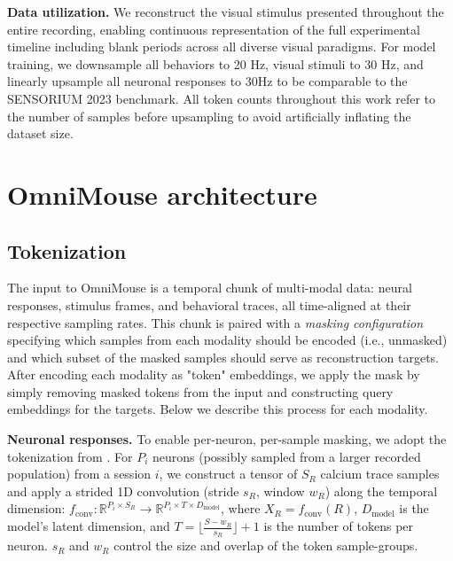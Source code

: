 \documentclass{article} %
\begin{document}
\textbf{Data utilization.} 
We reconstruct the visual stimulus presented throughout the entire recording, enabling continuous representation of the full experimental timeline including blank periods across all diverse visual paradigms. 
For model training, we downsample all behaviors to 20 Hz, visual stimuli to 30 Hz, and  linearly upsample all neuronal responses to 30Hz to be comparable to the SENSORIUM 2023 benchmark. All token counts throughout this work refer to the number of samples before upsampling to avoid artificially inflating the dataset size.


\section{OmniMouse architecture}
\label{sec:architecture}
\subsection{Tokenization}

The input to OmniMouse is a temporal chunk of multi-modal data: neural responses, stimulus frames, and behavioral traces, all time-aligned at their respective sampling rates. This chunk is paired with a \textit{masking configuration} specifying which samples from each modality should be encoded (i.e., unmasked) and which subset of the masked samples should serve as reconstruction targets. After encoding each modality as "token" embeddings, we apply the mask by simply removing masked tokens from the input and constructing query embeddings for the targets. Below we describe this process for each modality.

\textbf{Neuronal responses.} To enable per-neuron, per-sample masking, we adopt the tokenization from \cite{poyov2iclr2025, duan2025poco}. For $P_{i}$ neurons (possibly sampled from a larger recorded population) from a session $i$, we construct a tensor of $S_R$ calcium trace samples and apply a strided 1D convolution (stride $s_R$, window $w_R$) along the temporal dimension: $f_{\text{conv}}: \mathbb{R}^{P_i \times S_R} \to \mathbb{R}^{P_i \times T \times D_{\text{model}}}$, where $X_R = f_{\text{conv}}(R)$, $D_{\text{model}}$ is the model's latent dimension, and $T = \lfloor \frac{S - w_R}{s_R} \rfloor + 1$ is the number of tokens per neuron. $s_R$ and $w_R$ control the size and overlap of the token sample-groups.
\end{document}
